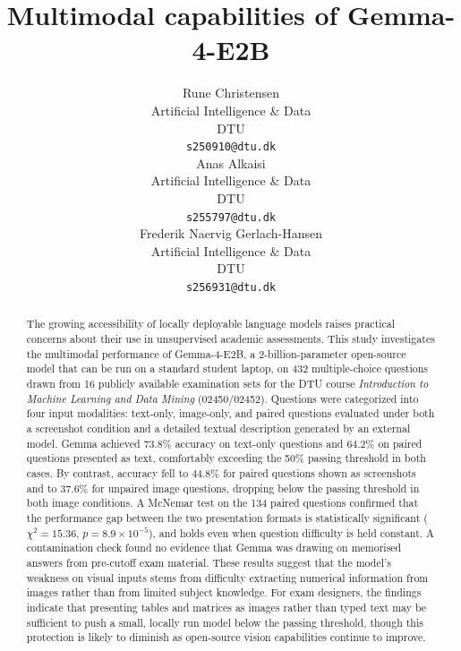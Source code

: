 \documentclass{article}
\title{Multimodal capabilities of Gemma-4-E2B}
\author{
    Rune Christensen\\
    Artificial Intelligence \& Data  \\
    DTU \\
    \texttt{s250910@dtu.dk} \\
    \And
    Anas Alkaisi\\
    Artificial Intelligence \& Data\\
    DTU \\
    \texttt{s255797@dtu.dk} \\
    \And
    Frederik Naervig Gerlach-Hansen \\
    Artificial Intelligence \& Data \\
    DTU \\
    \texttt{s256931@dtu.dk} \\
}
\begin{document}
\maketitle

\begin{abstract}


The growing accessibility of locally deployable language models raises practical
concerns about their use in unsupervised academic assessments. This study
investigates the multimodal performance of Gemma-4-E2B, a 2-billion-parameter
open-source model that can be run on a standard student laptop, on 432
multiple-choice questions drawn from 16 publicly available examination sets for
the DTU course \textit{Introduction to Machine Learning and Data Mining}
(02450/02452). Questions were categorized into four input modalities: text-only,
image-only, and paired questions evaluated under both a screenshot condition and
a detailed textual description generated by an external model. Gemma achieved
73.8\% accuracy on text-only questions and 64.2\% on paired questions presented
as text, comfortably exceeding the 50\% passing threshold in both cases. By
contrast, accuracy fell to 44.8\% for paired questions shown as screenshots and
to 37.6\% for unpaired image questions, dropping below the passing threshold in
both image conditions. A McNemar test on the 134 paired questions confirmed that
the performance gap between the two presentation formats is statistically
significant ($\chi^2 = 15.36$, $p = 8.9 \times 10^{-5}$), and holds even when
question difficulty is held constant. A contamination check found no evidence
that Gemma was drawing on memorised answers from pre-cutoff exam material. These
results suggest that the model's weakness on visual inputs stems from difficulty
extracting numerical information from images rather than from limited subject
knowledge. For exam designers, the findings indicate that presenting tables and
matrices as images rather than typed text may be sufficient to push a small,
locally run model below the passing threshold, though this protection is likely
to diminish as open-source vision capabilities continue to improve.




\end{abstract}


\newpage
\end{document}
